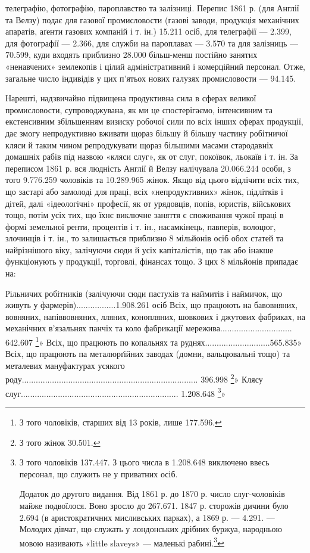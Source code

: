 телеграфію, фотографію, пароплавство та залізниці. Перепис
1861 р. (для Англії та Велзу) подає для газової промисловости
(газові заводи, продукція механічних апаратів, аґенти газових
компаній і т. ін.) 15.211 осіб, для телеграфії — 2.399, для фотографії
— 2.366, для служби на пароплавах — 3.570 та для залізниць —
70.599, куди входять приблизно 28.000 більш-менш постійно
занятих «ненавчених» землекопів і цілий адміністративний і комерційний
персонал. Отже, загальне число індивідів у цих п’ятьох
нових галузях промисловости — 94.145.

Нарешті, надзвичайно підвищена продуктивна сила в сферах
великої промисловости, супроводжувана, як ми це спостерігаємо,
інтенсивним та екстенсивним збільшенням визиску робочої
сили по всіх інших сферах продукції, дає змогу непродуктивно
вживати щораз більшу й більшу частину робітничої кляси й таким
чином репродукувати щораз більшими масами стародавніх домашніх
рабів під назвою «кляси слуг», як от слуг, покоївок, льокаїв
і т. ін. За переписом 1861 р. вся людність Англії й Велзу налічувала
20.066.244 особи, з того 9.776.259 чоловіків та 10.289.965 жінок.
Якщо від цього відлічити всіх тих, що застарі або замолоді
для праці, всіх «непродуктивних» жінок, підлітків і дітей,
далі «ідеологічні» професії, як от урядовців, попів, юристів,
військових тощо, потім усіх тих, що їхнє виключне заняття є
споживання чужої праці в формі земельної ренти, процентів і
т. ін., насамкінець, павперів, волоцюг, злочинців і т. ін., то залишається
приблизно 8 мільйонів осіб обох статей та найрізнішого
віку, залічуючи сюди й усіх капіталістів, що так або інакше
функціонують у продукції, торговлі, фінансах тощо. З цих 8 мільйонів
припадає на:

Рільничих робітників (залічуючи сюди пастухів та
наймитів і наймичок, що живуть у фармерів).................1.908.261 осіб
Всіх, що працюють на бавовняних, вовняних, напіввовняних,
лляних, конопляних, шовкових
і джутових фабриках, на механічних в’язальнях
панчіх та коло фабрикації мережива............................... 642.607 \footnote{
З того чоловіків, старших від 13 років, лише 177.596.
}»
Всіх, що працюють по копальнях та руднях............................565.835»
Всіх, що працюють па металюрґійних заводах
(домни, вальцювальні тощо) та металевих мануфактурах усякого
роду............................................................................ 396.998 \footnote{
З того жінок 30.501.
}»
Клясу слуг.................................................................... 1.208.648 \footnote{
З того чоловіків 137.447. З цього числа в 1.208.648 виключено ввесь
персонал, що служить не у приватних осіб.

Додаток до другого видання. Від 1861 р. до 1870 р. число слуг-чоловіків
майже подвоїлося. Воно зросло до 267.671. 1847 р. сторожів дичини
було 2.694 (в аристократичних мисливських парках), а 1869 р. — 4.291.
— Молодих дівчат, що служать у лондонських дрібних буржуа, народньою
мовою називають «little slaveys» — маленькі рабині.\footnote*{
Тут у власному Марксовому примірнику 1 німецького видання є
така цитата з «Evening Star» від 11 вересня 1868 р.: «Як виснажують над-
}
}»